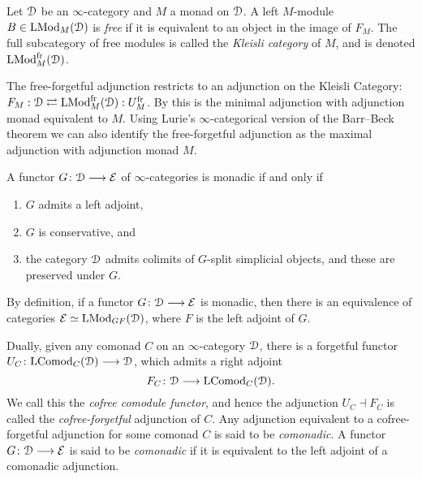 \begin{definition}
    Let $\EuScript{D}$ be an $\infty$-category and $M$ a monad on $\EuScript{D}$. A left $M$-module $B\in \mathrm{LMod}_M(\EuScript{D})$ is \emph{free} if it is equivalent to an object in the image of $F_M$. The full subcategory of free modules is called the \emph{Kleisli category} of $M$, and is denoted $\mathrm{LMod}_M^{\mathrm{fr}}(\EuScript{D})$. 
\end{definition}

The free-forgetful adjunction restricts to an adjunction on the Kleisli Category: $F_M:\EuScript{D}\rightleftarrows \mathrm{LMod}_M^{\mathrm{fr}}(\EuScript{D}):U_M^{\mathrm{fr}}$. By \cite[1.8]{christ_2023} this is the minimal adjunction with adjunction monad equivalent to $M$. Using Lurie's $\infty$-categorical version of the Barr--Beck theorem we can also identify the free-forgetful adjunction as the maximal adjunction with adjunction monad $M$. 

\begin{theorem}
    \label{ch2:thm:Lurie-BB}
    A functor $G\colon \EuScript{D}\longrightarrow \mathcal{E}$ of $\infty$-categories is monadic if and only if 
    \begin{enumerate}
        \item $G$ admits a left adjoint,
        \item $G$ is conservative, and
        \item the category $\EuScript{D}$ admits colimits of $G$-split simplicial objects, and these are preserved under $G$. 
    \end{enumerate}
\end{theorem}

\begin{remark}
    By definition, if a functor $G\colon \EuScript{D}\longrightarrow \mathcal{E}$ is monadic, then there is an equivalence of categories $\mathcal{E}\simeq \mathrm{LMod}_{GF}(\EuScript{D})$, where $F$ is the left adjoint of $G$. 
\end{remark}

\begin{definition}
    Dually, given any comonad $C$ on an $\infty$-category $\EuScript{D}$, there is a forgetful functor $U_C\colon \mathrm{LComod}_C(\EuScript{D})\longrightarrow \EuScript{D}$, which admits a right adjoint 
    \[F_C\colon \EuScript{D}\longrightarrow \mathrm{LComod}_C(\EuScript{D}).\] 
    We call this the \emph{cofree comodule functor}, and hence the adjunction $U_C\dashv F_C$ is called the \emph{cofree-forgetful} adjunction of $C$. Any adjunction equivalent to a cofree-forgetful adjunction for some comonad $C$ is said to be \emph{comonadic}. A functor $G\colon \EuScript{D}\longrightarrow \mathcal{E}$ is said to be \emph{comonadic} if it is equivalent to the left adjoint of a comonadic adjunction. 
\end{definition}

